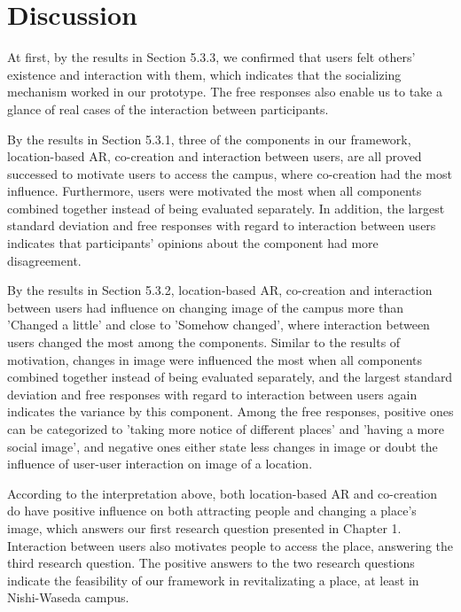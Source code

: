 \chapter{Discussion}\label{ch:6}


At first, by the results in Section 5.3.3, we confirmed that users felt others' existence and interaction with them, which indicates that the socializing mechanism worked in our prototype.
The free responses also enable us to take a glance of real cases of the interaction between participants.

By the results in Section 5.3.1, three of the components in our framework, location-based AR, co-creation and interaction between users, are all proved successed to motivate users to access the campus, where co-creation had the most influence.
Furthermore, users were motivated the most when all components combined together instead of being evaluated separately.
In addition, the largest standard deviation and free responses with regard to interaction between users indicates that participants' opinions about the component had more disagreement.

By the results in Section 5.3.2, location-based AR, co-creation and interaction between users had influence on changing image of the campus more than 'Changed a little' and close to 'Somehow changed',
where interaction between users changed the most among the components.
Similar to the results of motivation, changes in image were influenced the most when all components combined together instead of being evaluated separately,
and the largest standard deviation and free responses with regard to interaction between users again indicates the variance by this component.
Among the free responses, positive ones can be categorized to 'taking more notice of different places' and 'having a more social image',
and negative ones either state less changes in image or doubt the influence of user-user interaction on image of a location.

According to the interpretation above, both location-based AR and co-creation do have positive influence on both attracting people and changing a place's image, which answers our first research question presented in Chapter 1.
Interaction between users also motivates people to access the place, answering the third research question.
The positive answers to the two research questions indicate the feasibility of our framework in revitalizating a place, at least in Nishi-Waseda campus.

